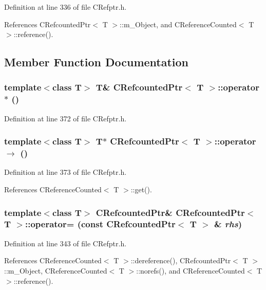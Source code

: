 Definition at line 336 of file CRefptr.h.

References CRefcounted\-Ptr$<$ T $>$::m\_\-Object, and CReference\-Counted$<$ T $>$::reference().

\subsection{Member Function Documentation}
\subsubsection{\setlength{\rightskip}{0pt plus 5cm}template$<$class T$>$ T\& CRefcounted\-Ptr$<$ T $>$::operator $\ast$ ()\hspace{0.3cm}{\tt  [inline]}}\label{classCRefcountedPtr_a7}




Definition at line 372 of file CRefptr.h.
\subsubsection{\setlength{\rightskip}{0pt plus 5cm}template$<$class T$>$ T$\ast$ CRefcounted\-Ptr$<$ T $>$::operator $\rightarrow$  ()\hspace{0.3cm}{\tt  [inline]}}\label{classCRefcountedPtr_a8}




Definition at line 373 of file CRefptr.h.

References CReference\-Counted$<$ T $>$::get().
\subsubsection{\setlength{\rightskip}{0pt plus 5cm}template$<$class T$>$ CRefcounted\-Ptr\& CRefcounted\-Ptr$<$ T $>$::operator= (const CRefcounted\-Ptr$<$ T $>$ \& {\em rhs})\hspace{0.3cm}{\tt  [inline]}}\label{classCRefcountedPtr_a4}




Definition at line 343 of file CRefptr.h.

References CReference\-Counted$<$ T $>$::dereference(), CRefcounted\-Ptr$<$ T $>$::m\_\-Object, CReference\-Counted$<$ T $>$::norefs(), and CReference\-Counted$<$ T $>$::reference().
